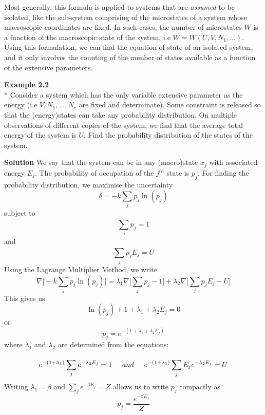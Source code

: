 \documentclass[oneside]{book}
\begin{document}
Most generally, this formula is applied to systems that are \emph{assumed} to be isolated, like the sub-system comprising of the microstates of a system whose macroscopic coordinates are fixed. In such cases, the number of microstates $W$ is a function of the macroscopic state of the system, i.e $W = W(U,V,N_1,...)$. Using this formulation, we can find the equation of state of an isolated system, and it only involves the counting of the number of states available as a function of the extensive parameters.

 \begin{mdframed}[style=exercise]
\textbf{Example 2.2}
 \\* Consider a system which has the only variable extensive parameter as the energy (i.e $V, N_1,...,N_r$ are fixed and determinate). Some constraint is released so that the (energy)states can take any probability distribution. On multiple observations of different copies of the system, we find that the average total energy of the system is $U$. Find the probability distribution of the states of the system.
 \end{mdframed}
 \textbf{Solution} We say that the system can be in any (macro)state $x_j$ with associated energy $E_j$. The probability of occupation of the $j^{th}$ state is $p_j$. For finding the probability distribution, we maximise the uncertainty
 \[ \delta = -k\sum_{j}^{}p_j\ln(p_j)\]
 subject to 
  \[\sum_{j}^{}p_j = 1 \]
  and
  \[\sum_{j}^{}p_jE_j = U \]
   Using the Lagrange Multiplier Method, we write
  \[  \nabla \Big[-k\sum_{j}^{}p_j\ln(p_j)\Big] = \lambda_1\nabla\Big[\sum_{j}^{}p_j - 1\big] +\lambda_2\nabla\Big[\sum_{j}^{}p_jE_j - U \Big]\]
 This gives us 
 \[\ln(p_j) + 1 + \lambda_1 + \lambda_2E_j  = 0 \]
 or
 \[ p_j = e^{-(1 + \lambda_1 + \lambda_2E_j)}\]
 where $\lambda_1$ and $\lambda_2$ are determined from the equations:
 
 \[ e^{-(1 + \lambda_1)} \sum_{j}^{}e^{-\lambda_2E_j} = 1
 \hspace{0.5cm} and \hspace{0.5cm}
 e^{-(1 + \lambda_1)} \sum_{j}^{}E_je^{-\lambda_2E_j} = U\]
 Writing $\lambda_1 = \beta$ and $\sum_{j}^{}e^{-\beta E_j} = Z$ allows us to write $p_j$ compactly as
  \[ p_j = \frac{e^{-\beta E_j}}{Z}\]
 
\end{document}
